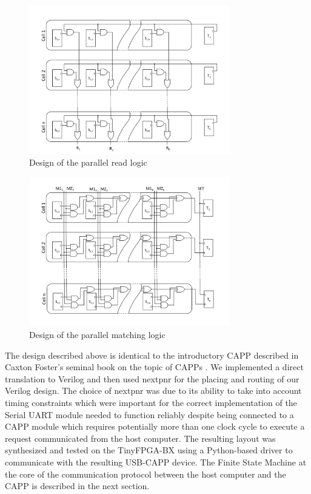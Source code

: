 \begin{figure}
  \includegraphics[height=6.5cm]{FPGA-CAPP_research_paper/images/read_lines.png}
  \caption{Design of the parallel read logic}
  \label{read_lines}
\end{figure}

\begin{figure}
  \includegraphics[height=6.5cm]{FPGA-CAPP_research_paper/images/mismatch_lines.png}
  \caption{Design of the parallel matching logic}
  \label{mismatch_lines}
\end{figure}

The design described above is identical to the introductory CAPP described in Caxton Foster's seminal book on the topic of CAPPs \cite{capp}. We implemented a direct translation to Verilog and then used nextpnr \cite{8735573} for the placing and routing of our Verilog design. The choice of nextpnr was due to its ability to take into account timing constraints which were important for the correct implementation of the Serial UART module needed to function reliably despite being connected to a CAPP module which requires potentially more than one clock cycle to execute a request communicated from the host computer. The resulting layout was synthesized and tested on the TinyFPGA-BX using a Python-based driver to communicate with the resulting USB-CAPP device.
The Finite State Machine at the core of the communication protocol between the host computer and the CAPP is described in the next section.